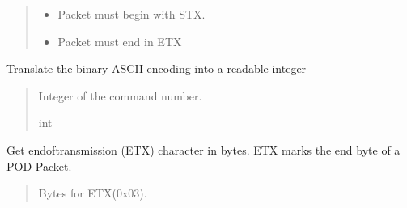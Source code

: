 \documentclass[letterpaper,10pt,english]{sphinxmanual}
\begin{document}
\begin{fulllineitems}
\begin{fulllineitems}
\begin{quote}
\begin{description}
\begin{itemize}
\item {} 
\sphinxAtStartPar
{} \textendash{} Packet must begin with STX.

\item {} 
\sphinxAtStartPar
{} \textendash{} Packet must end in ETX

\end{itemize}

\end{description}\end{quote}

\end{fulllineitems}


\begin{fulllineitems}
\label{\detokenize{Morelia.Packets:Morelia.Packets.Packet.Packet.CommandNumber}}
\pysigstartsignatures
{}
\pysigstopsignatures
\sphinxAtStartPar
Translate the binary ASCII encoding into a readable integer
\begin{quote}\begin{description}
\sphinxAtStartPar
Integer of the command number.

\sphinxAtStartPar
int

\end{description}\end{quote}

\end{fulllineitems}


\begin{fulllineitems}
\label{\detokenize{Morelia.Packets:Morelia.Packets.Packet.Packet.ETX}}
\pysigstartsignatures
{}
\pysigstopsignatures
\sphinxAtStartPar
Get end\sphinxhyphen{}of\sphinxhyphen{}transmission (ETX) character in bytes. ETX marks the end byte of a POD Packet.
\begin{quote}\begin{description}
\sphinxAtStartPar
Bytes for ETX(0x03).


\end{description}
\end{quote}
\end{fulllineitems}
\end{fulllineitems}
\end{document}
